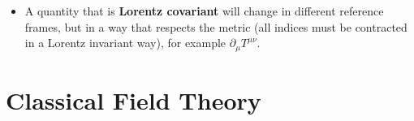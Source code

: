 \documentclass[12pt, oneside]{article}   	%
\theoremstyle{definition}
\begin{document}
\begin{itemize}
	\item A quantity that is \textbf{Lorentz covariant} will change in different reference frames, but in a way that respects the metric (all indices must be contracted in a Lorentz invariant way), for example $\partial_\mu T^{\mu\nu}$. 
	
	
	
\end{itemize}

\section*{Classical Field Theory}


\end{document}
